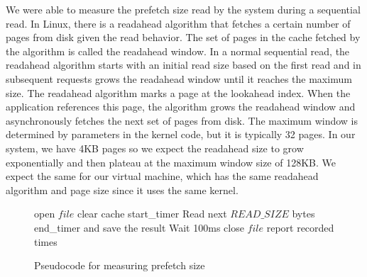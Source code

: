 We were able to measure the prefetch size read by the system during a sequential 
read. In Linux, there is a readahead algorithm that fetches a certain number of 
pages from disk given the read behavior. The set of pages in the cache fetched by 
the algorithm is called the readahead window. In a normal sequential read, the 
readahead algorithm starts with an initial read size based on the first read and in
subsequent requests grows the readahead window until it reaches the maximum size. 
The readahead algorithm marks a page at the lookahead index. When the application 
references this page, the algorithm grows the readahead window and asynchronously 
fetches the next set of pages from disk.\cite{wu2010sequential}\cite{wu2007linux} 
The maximum window is determined by 
parameters in the kernel code, but it is typically 32 pages. In our system, we have
4KB pages so we expect the readahead size to grow exponentially and then plateau at
the maximum window size of 128KB. We expect the same for our virtual machine, which 
has the same readahead algorithm and page size since it uses the same kernel.

\begin{figure}[t!]
	\begin{algorithmic}
		\STATE open $file$
		\STATE clear cache
		\STATE start\_timer
		\STATE Read next $READ\_SIZE$ bytes
		\STATE end\_timer and save the result
		\STATE Wait 100ms
		\ENDFOR
		\STATE close $file$
		\STATE report recorded times
	\end{algorithmic}
	\caption{Pseudocode for measuring prefetch size}
	\label{fig:p2_code}
\end{figure}

